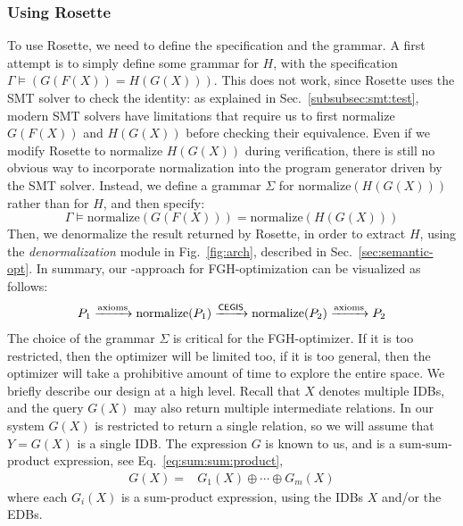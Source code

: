 \subsubsection{Using Rosette} To use Rosette, we need to define the
specification and the grammar. A first attempt is to simply define
some grammar for $H$, with the specification
$\Gamma \models \left(G(F(X)) = H(G(X))\right)$.  This does not work,
since Rosette uses the SMT solver to check the identity: as explained
in Sec.~\ref{subsubsec:smt:test}, modern SMT solvers have limitations
that require us to first normalize $G(F(X))$ and $H(G(X))$ before
checking their equivalence.
Even if we modify Rosette
to normalize $H(G(X))$ during verification,
there is still no obvious way to incorporate normalization
into the program generator driven by the SMT solver.
Instead,
we define a grammar $\Sigma$ for $\text{normalize}(H(G(X)))$ rather
than for $H$, and then specify:
\[
\Gamma \models \text{normalize}(G(F(X))) = \text{normalize}(H(G(X)))
\]
Then, we denormalize the result
returned by Rosette, in order to extract $H$, using the {\em
  denormalization} module in Fig.~\ref{fig:arch}, described in
Sec.~\ref{sec:semantic-opt}.  In summary, our \cegis-approach for
FGH-optimization can be visualized as follows:
%
\begin{align}
  P_{1} \xrightarrow[]{\text{axioms}} \text{normalize}(P_{1}) \xrightarrow[]{\textsf{CEGIS}} \text{normalize}(P_{2}) \xrightarrow[]{\text{axioms}} P_{2}
  \label{eq:synthesis:cegis2}
\end{align}
%
The choice of the grammar $\Sigma$ is critical for the FGH-optimizer.
If it is too restricted, then the optimizer will be limited too, if it
is too general, then the optimizer will take a prohibitive amount of
time to explore the entire space.  We briefly describe our design at a
high level.  Recall that $X$ denotes multiple IDBs, and the query
$G(X)$ may also return multiple intermediate relations. In our system
$G(X)$ is restricted to return a single relation, so we will assume
that $Y = G(X)$ is a single IDB.  The expression $G$ is known to us,
and is a sum-sum-product expression, see
Eq.~\eqref{eq:sum:sum:product},
%
\begin{align*}
  G(X) = & G_1(X) \oplus \cdots \oplus G_m(X)
\end{align*}
%
where each $G_i(X)$ is a sum-product expression, using the IDBs $X$ and/or the EDBs.

